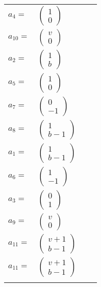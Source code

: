 \documentclass[1p]{elsarticle_modified}
\theoremstyle{definition}
\begin{document}
\begin{tabular}{m{7pt} m{180pt} m{7pt} m{180pt} }
\flushright $a_{4}=$&$\begin{pmatrix}1\\0\end{pmatrix}$ \\
\flushright $a_{10}=$&$\begin{pmatrix}v\\0\end{pmatrix}$ \\
\flushright $a_{2}=$&$\begin{pmatrix}1\\b\end{pmatrix}$ \\
\flushright $a_{5}=$&$\begin{pmatrix}1\\0\end{pmatrix}$ \\
\flushright $a_{7}=$&$\begin{pmatrix}0\\-1\end{pmatrix}$ \\
\flushright $a_{8}=$&$\begin{pmatrix}1\\b-1\end{pmatrix}$ \\
\flushright $a_{1}=$&$\begin{pmatrix}1\\b-1\end{pmatrix}$ \\
\flushright $a_{6}=$&$\begin{pmatrix}1\\-1\end{pmatrix}$ \\
\flushright $a_{3}=$&$\begin{pmatrix}0\\1\end{pmatrix}$ \\
\flushright $a_{9}=$&$\begin{pmatrix}v\\0\end{pmatrix}$ \\
\flushright $a_{11}=$&$\begin{pmatrix}v+1\\b-1\end{pmatrix}$\\ \flushright $a_{11}=$&$\begin{pmatrix}v+1\\b-1\end{pmatrix}$\\&\end{tabular}
\end{document}
